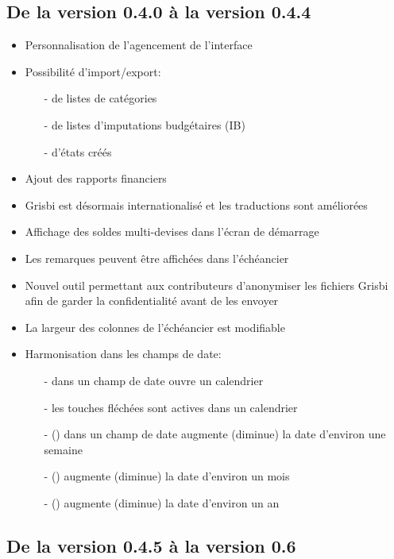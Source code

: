 
\subsection{De la version 0.4.0 à la version 0.4.4}

\begin{itemize}
	\item Personnalisation de l'agencement de l'interface
	\item Possibilité d'import/export:
		\begin{itemize}
		\item[-] de listes de catégories
		\item[-] de listes d'imputations budgétaires (IB)
		\item[-] d'états créés
		\end{itemize}	
	\item Ajout des rapports financiers
	\item Grisbi est désormais internationalisé et les traductions sont améliorées
	\item Affichage des soldes multi-devises dans l'écran de démarrage
	\item Les remarques peuvent être affichées dans l'échéancier
	\item Nouvel outil permettant aux contributeurs d'anonymiser les fichiers Grisbi afin de garder la confidentialité avant de les envoyer
	\item La largeur des colonnes de l'échéancier est modifiable
	\item Harmonisation dans les champs de date:
		\begin{itemize}
		\item[-]  dans un champ de date ouvre un calendrier
		\item[-] les touches fléchées sont actives dans un calendrier
		\item[-] \key{+} (\key{-}) dans un champ de date augmente (diminue) la date d'environ une semaine
		\item[-]  () augmente (diminue) la date d'environ un mois
		\item[-]  () augmente (diminue) la date d'environ un an
		\end{itemize}	
\end{itemize}

\subsection{De la version 0.4.5 à la version 0.6}

